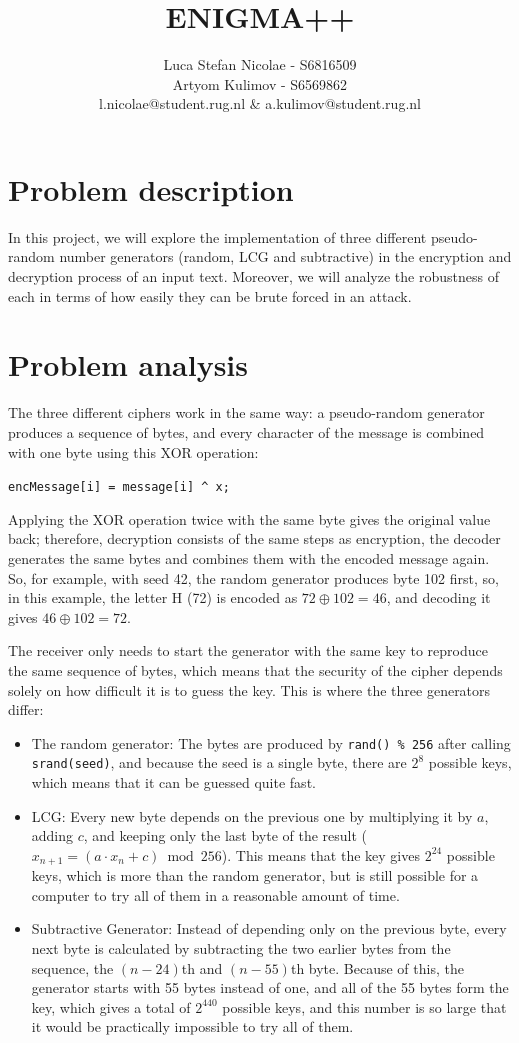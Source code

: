 \documentclass[a4paper,10pt]{article}
\title{ENIGMA++}
\author{Luca Stefan Nicolae - S6816509  \\
        Artyom Kulimov - S6569862  \\
        l.nicolae@student.rug.nl  \& a.kulimov@student.rug.nl}
\begin{document}
\maketitle

\section{Problem description}
In this project, we will explore the implementation of three different pseudo-random number
generators (random, LCG and subtractive) in the encryption and decryption process of an input text. Moreover, we will analyze the robustness of each in terms of how easily they can be brute forced in an attack.

\section{Problem analysis}
The three different ciphers work in the same way: a pseudo-random generator produces a sequence of bytes, and every character of the message is combined with one byte using this XOR operation:
\begin{center}
\texttt{encMessage[i] = message[i] \^{} x;}
\end{center}
Applying the XOR operation twice with the same byte gives the original value back; therefore, decryption consists of the same steps as encryption, the decoder generates the same bytes and combines them with the encoded message again.
So, for example, with seed 42, the random generator produces byte 102 first, so, in this example, the letter H (72) is encoded as $72 \oplus 102 = 46$, and decoding it gives $46 \oplus 102 = 72$.

The receiver only needs to start the generator with the same key to reproduce the same sequence of bytes, which means that the security of the cipher depends solely on how difficult it is to guess the key.
This is where the three generators differ:
\begin{itemize}
\item The random generator: The bytes are produced by \texttt{rand() \% 256} after calling \texttt{srand(seed)}, and because the seed is a single byte, there are $2^8$ possible keys, which means that it can be guessed quite fast.
\item LCG: Every new byte depends on the previous one by multiplying it by $a$, adding $c$, and keeping only the last byte of the result ($x_{n+1} = (a \cdot x_n + c) \bmod 256$). This means that the key gives $2^{24}$ possible keys, which is more than the random generator, but is still possible for a computer to try all of them in a reasonable amount of time.
\item Subtractive Generator: Instead of depending only on the previous byte, every next byte is calculated by subtracting the two earlier bytes from the sequence, the $(n-24)$th and $(n-55)$th byte. Because of this, the generator starts with 55 bytes instead of one, and all of the 55 bytes form the key, which gives a total of $2^{440}$ possible keys, and this number is so large that it would be practically impossible to try all of them.

\end{itemize}
\end{document}
